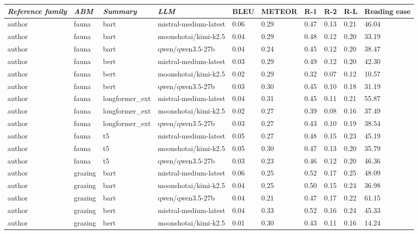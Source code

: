 \begin{tabular}{|l|l|l|l|l|l|l|l|l|l|}
\hline
\textit{\textbf{Reference family}} & \textit{\textbf{ABM}} & \textit{\textbf{Summary}} & \textit{\textbf{LLM}} & BLEU & METEOR & R-1 & R-2 & R-L & Reading ease \\
 \hline
 author & fauna & bart & mistral-medium-latest & 0.06 & 0.29 & 0.47 & 0.13 & 0.21 & 46.04 \\
 \hline
 author & fauna & bart & moonshotai/kimi-k2.5 & 0.04 & 0.29 & 0.48 & 0.12 & 0.20 & 33.19 \\
 \hline
 author & fauna & bart & qwen/qwen3.5-27b & 0.04 & 0.24 & 0.45 & 0.12 & 0.20 & 38.47 \\
 \hline
 author & fauna & bert & mistral-medium-latest & 0.03 & 0.29 & 0.49 & 0.12 & 0.20 & 42.30 \\
 \hline
 author & fauna & bert & moonshotai/kimi-k2.5 & 0.02 & 0.29 & 0.32 & 0.07 & 0.12 & 10.57 \\
 \hline
 author & fauna & bert & qwen/qwen3.5-27b & 0.03 & 0.30 & 0.45 & 0.10 & 0.18 & 31.19 \\
 \hline
 author & fauna & longformer\_ext & mistral-medium-latest & 0.04 & 0.31 & 0.45 & 0.11 & 0.21 & 55.87 \\
 \hline
 author & fauna & longformer\_ext & moonshotai/kimi-k2.5 & 0.02 & 0.27 & 0.39 & 0.08 & 0.16 & 37.49 \\
 \hline
 author & fauna & longformer\_ext & qwen/qwen3.5-27b & 0.03 & 0.27 & 0.43 & 0.10 & 0.19 & 38.54 \\
 \hline
 author & fauna & t5 & mistral-medium-latest & 0.05 & 0.27 & 0.48 & 0.15 & 0.23 & 45.19 \\
 \hline
 author & fauna & t5 & moonshotai/kimi-k2.5 & 0.05 & 0.30 & 0.47 & 0.13 & 0.20 & 35.79 \\
 \hline
 author & fauna & t5 & qwen/qwen3.5-27b & 0.03 & 0.23 & 0.46 & 0.12 & 0.20 & 46.36 \\
 \hline
 author & grazing & bart & mistral-medium-latest & 0.06 & 0.25 & 0.52 & 0.17 & 0.25 & 48.09 \\
 \hline
 author & grazing & bart & moonshotai/kimi-k2.5 & 0.04 & 0.25 & 0.50 & 0.15 & 0.24 & 36.98 \\
 \hline
 author & grazing & bart & qwen/qwen3.5-27b & 0.04 & 0.21 & 0.47 & 0.17 & 0.22 & 61.15 \\
 \hline
 author & grazing & bert & mistral-medium-latest & 0.04 & 0.33 & 0.52 & 0.16 & 0.24 & 45.33 \\
 \hline
 author & grazing & bert & moonshotai/kimi-k2.5 & 0.01 & 0.30 & 0.43 & 0.11 & 0.16 & 14.24 \\

\end{tabular}
